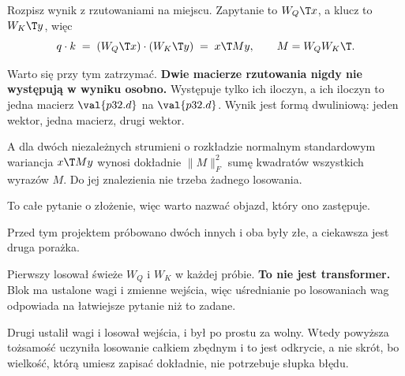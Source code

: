 \begin{fr}

Rozpisz wynik z rzutowaniami na miejscu. Zapytanie to $W_Q\T x$, a klucz to
$W_K\T y$, więc
\[ q \cdot k \;=\; (W_Q\T x) \cdot (W_K\T y) \;=\; x\T M y,
   \qquad M = W_Q W_K\T. \]

Warto się przy tym zatrzymać. \textbf{Dwie macierze rzutowania nigdy nie
występują w wyniku osobno.} Występuje tylko ich iloczyn, a ich iloczyn to
jedna macierz $\val{p32.d}$ na $\val{p32.d}$. Wynik jest formą dwuliniową:
jeden wektor, jedna macierz, drugi wektor.

A dla dwóch niezależnych strumieni o rozkładzie normalnym standardowym
wariancja $x\T M y$ wynosi dokładnie $\lVert M\rVert_F^{2}$ \dash{} sumę
kwadratów wszystkich wyrazów $M$. Do jej znalezienia nie trzeba żadnego
losowania.

To całe pytanie o złożenie, więc warto nazwać objazd, który ono zastępuje.

\begin{note}
Przed tym projektem próbowano dwóch innych i oba były złe, a ciekawsza jest
druga porażka.

Pierwszy losował świeże $W_Q$ i $W_K$ w każdej próbie. \textbf{To nie jest
transformer.} Blok ma ustalone wagi i zmienne wejścia, więc uśrednianie po
losowaniach wag odpowiada na łatwiejsze pytanie niż to zadane.

Drugi ustalił wagi i losował wejścia, i był po prostu za wolny. Wtedy
powyższa tożsamość uczyniła losowanie całkiem zbędnym \dash{} i to jest
odkrycie, a nie skrót, bo wielkość, którą umiesz zapisać dokładnie, nie
potrzebuje słupka błędu.
\end{note}
\end{fr}


